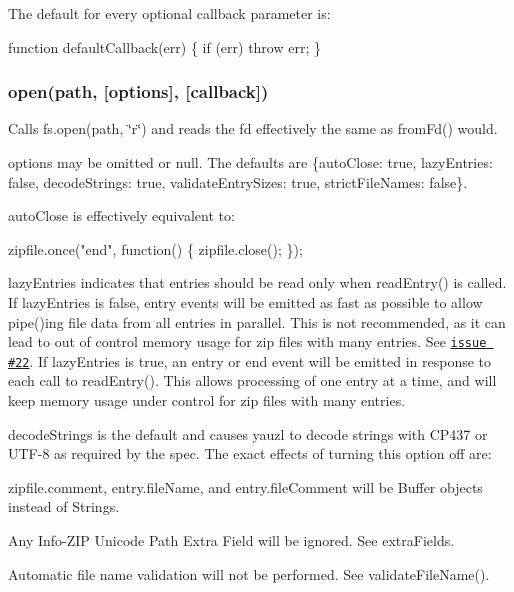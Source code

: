 The default for every optional {\ttfamily callback} parameter is\+:


\begin{DoxyCode}
function defaultCallback(err) \{
  if (err) throw err;
\}
\end{DoxyCode}


\subsubsection*{open(path, \mbox{[}options\mbox{]}, \mbox{[}callback\mbox{]})}

Calls {\ttfamily fs.\+open(path, \char`\"{}r\char`\"{})} and reads the {\ttfamily fd} effectively the same as {\ttfamily from\+Fd()} would.

{\ttfamily options} may be omitted or {\ttfamily null}. The defaults are {\ttfamily \{auto\+Close\+: true, lazy\+Entries\+: false, decode\+Strings\+: true, validate\+Entry\+Sizes\+: true, strict\+File\+Names\+: false\}}.

{\ttfamily auto\+Close} is effectively equivalent to\+:


\begin{DoxyCode}
zipfile.once("end", function() \{
  zipfile.close();
\});
\end{DoxyCode}


{\ttfamily lazy\+Entries} indicates that entries should be read only when {\ttfamily read\+Entry()} is called. If {\ttfamily lazy\+Entries} is {\ttfamily false}, {\ttfamily entry} events will be emitted as fast as possible to allow {\ttfamily pipe()}ing file data from all entries in parallel. This is not recommended, as it can lead to out of control memory usage for zip files with many entries. See \href{https://github.com/thejoshwolfe/yauzl/issues/22}{\tt issue \#22}. If {\ttfamily lazy\+Entries} is {\ttfamily true}, an {\ttfamily entry} or {\ttfamily end} event will be emitted in response to each call to {\ttfamily read\+Entry()}. This allows processing of one entry at a time, and will keep memory usage under control for zip files with many entries.

{\ttfamily decode\+Strings} is the default and causes yauzl to decode strings with {\ttfamily C\+P437} or {\ttfamily U\+T\+F-\/8} as required by the spec. The exact effects of turning this option off are\+:


\begin{DoxyItemize}
\item {\ttfamily zipfile.\+comment}, {\ttfamily entry.\+file\+Name}, and {\ttfamily entry.\+file\+Comment} will be {\ttfamily Buffer} objects instead of {\ttfamily String}s.
\item Any Info-\/\+Z\+IP Unicode Path Extra Field will be ignored. See {\ttfamily extra\+Fields}.
\item Automatic file name validation will not be performed. See {\ttfamily validate\+File\+Name()}.
\end{DoxyItemize}


